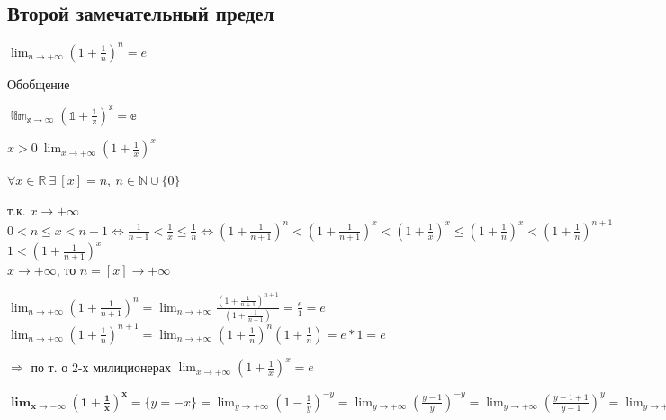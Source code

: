 \documentclass{article}
\begin{document}
    \subsection{Второй замечательный предел}
    
    \( \lim_{n \to +\infty} (1 + \frac{1}{n})^n = e \)

    Обобщение

    \(\mathbb{\lim_{x \to \infty} (1 + \frac{1}{x})^x = e}\)

    \( x > 0\ \lim_{x \to +\infty} (1 + \frac{1}{x})^x \)

    \(\forall x \in \mathbb{R}\ \exists\ [x] = n,\ n \in \mathbb{N} \cup \{ 0 \} \)

    т.к. \( x \to +\infty \)\\
    \( 0 < n \leq x < n + 1 \Leftrightarrow \frac{1}{n + 1} < \frac{1}{x} \leq \frac{1}{n} \Leftrightarrow (1 + \frac{1}{n + 1})^n < (1 + \frac{1}{n + 1})^x < (1 + \frac{1}{x})^x \leq (1 + \frac{1}{n})^x < (1 + \frac{1}{n})^{n + 1} \)\\
    \( 1 < (1 + \frac{1}{n + 1})^x \)\\
    \( x \to +\infty \), то \( n = [x] \to +\infty \)
    
    \( \lim_{n \to +\infty}(1 + \frac{1}{n + 1})^n = \lim_{n \to +\infty}\frac{(1 + \frac{1}{n + 1})^{n + 1}}{(1 + \frac{1}{n + 1})} = \frac{e}{1} = e \)\\    
    \(\lim_{n \to +\infty}(1 + \frac{1}{n})^{n+1} = \lim_{n \to +\infty}(1+\frac{1}{n})^n(1+\frac{1}{n}) = e * 1 = e\)

    \(\Rightarrow\) по т. о 2-х милиционерах \(\lim_{x \to +\infty}(1 + \frac{1}{x})^x = e\)

    \(\mathbf{\lim_{x \to -\infty}(1 + \frac{1}{x})^x} = \{ y = -x \} = \lim_{y \to +\infty}(1 - \frac{1}{y})^{-y} = \lim_{y \to +\infty}(\frac{y - 1}{y})^{-y} = \lim_{y \to +\infty}(\frac{y - 1 + 1}{y - 1})^y = \lim_{y \to +\infty}(1 + \frac{1}{y - 1})^y = \lim_{y \to +\infty}(1 + \frac{1}{y - 1})^{y - 1}(1 + \frac{1}{y - 1}) = e(1 + 0) = e \)
    
\end{document}
